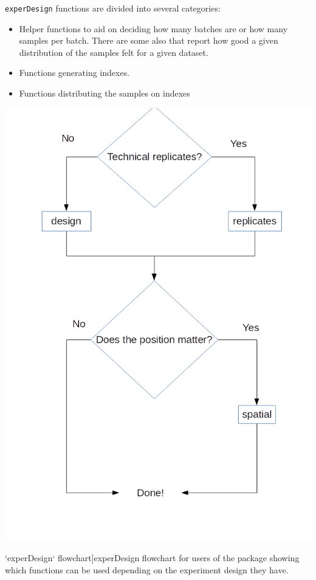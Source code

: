 \documentclass[
  a4paper,
]{book}
\let\origfigure\figure
\let\endorigfigure\endfigure
\renewenvironment{figure}[1][2] {
    \expandafter\origfigure\expandafter[!ht]
} {
    \endorigfigure
}
\begin{document}
\texttt{experDesign} functions are divided into several categories:

\begin{itemize}
\item
  Helper functions to aid on deciding how many batches are or how many samples per batch.
  There are some also that report how good a given distribution of the samples felt for a given dataset.
\item
  Functions generating indexes.
\item
  Functions distributing the samples on indexes
\end{itemize}

\begin{figure}
\includegraphics[width=1\linewidth]{images/experDesign-flowchart} \caption[`experDesign` flowchart]{experDesign flowchart for users of the package showing which functions can be used depending on the experiment design they have.}\label{fig:experdesign-flowchart}
\end{figure}
\end{document}
